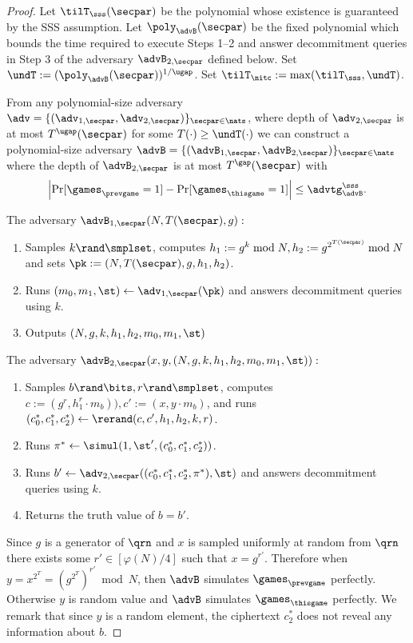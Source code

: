 \begin{proof}
Let $\tilT_\sss(\secpar)$ be the polynomial whose existence is guaranteed by the SSS assumption.
Let $\poly_\advB(\secpar)$ be the fixed polynomial which bounds the time required to execute Steps 1--2 and answer decommitment queries in Step 3 of the adversary $\advB_{2, \secpar}$ defined below. Set $\undT := (\poly_\advB(\secpar))^{1 / \ugap}$.  Set $\tilT_\nitc := \max(\tilT_\sss, \undT)$.
\begin{lemma}
From any polynomial-size adversary $\adv = \{(\adv_{1,\secpar}, \adv_{2, \secpar})\}_{\secpar \in \nats}$, where depth of $\adv_{2, \secpar}$ is at most $T^{\ugap}(\secpar)$ for some $T(\cdot) \geq \undT(\cdot)$ we can construct a polynomial-size adversary $\advB = \{(\advB_{1,\secpar}, \advB_{2, \secpar})\}_{\secpar \in \nats}$ where the depth of $\advB_{2, \secpar}$ is at most $T^{\gap}(\secpar)$ with
\[
\left|\Pr[\games_\prevgame = 1] - \Pr[\games_\thisgame = 1]\right| \leq \advtg_\advB^\sss.
\]
\end{lemma}

The adversary $\advB_{1,\secpar}(N, T(\secpar), g):$
\vspace{-2mm}
\begin{enumerate}
\item Samples $k \rand \smplset$, computes $h_1 := g^k \bmod N, h_2 := g^{2^{T(\secpar)}} \bmod N$ and sets $\pk:=(N, T(\secpar), g, h_1, h_2)$.
\item Runs $(m_0, m_1, \st) \leftarrow \adv_{1, \secpar}(\pk)$ and answers decommitment queries using $k$.
\item Outputs $(N,g,k,h_1,h_2, m_0, m_1, \st)$
\end{enumerate}

The adversary $\advB_{2,\secpar}(x,y,(N,g,k,h_1,h_2, m_0, m_1, \st)):$
\vspace{-2mm}
\begin{enumerate}
\item Samples $b \rand \bits, r \rand \smplset$, computes $c:=(g^r, h_1^{r}\cdot m_b)), c':= (x, y \cdot m_b)$, and runs $(c_0^*, c_1^*, c_2^*)\leftarrow \rerand(c, c', h_1, h_2, k, r)$.
\item Runs $\pi^* \leftarrow \simul(1, \st', (c_0^*, c_1^*, c_2^*))$.
\item Runs $b' \leftarrow \adv_{2, \secpar}((c_0^*, c_1^*, c_2^*, \pi^*), \st)$ and answers decommitment queries using $k$.
\item Returns the truth value of $b=b'$.
\end{enumerate}
Since $g$ is a generator of $\qrn$ and $x$ is sampled uniformly at random from $\qrn$ there exists some $r' \in [\varphi(N)/4]$ such that $x = g^{r'}$. Therefore when $y = x^{2^T} = (g^{2^T})^{r'} \bmod N$, then $\advB$ simulates $\games_\prevgame$ perfectly. Otherwise $y$ is random value and $\advB$ simulates $\games_\thisgame$ perfectly. We remark that since $y$ is a random element, the ciphertext $c^*_2$ does not reveal any information about $b$.


\end{proof}
